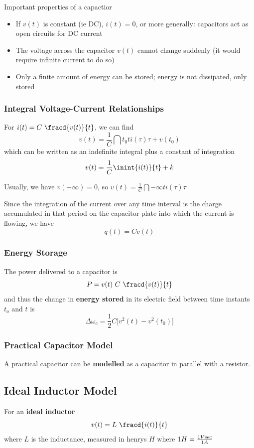 \documentclass[12pt]{article}
\begin{document}
Important properties of a capactior
\begin{itemize}
\item If $v(t)$ is constant (ie DC), $i(t) = 0$, or more generally: capacitors act as open circuits for DC current
\item The voltage across the capacitor $v(t)$ cannot change suddenly (it would require infinite current to do so)
\item Only a finite amount of energy can be stored; energy is not dissipated, only stored
\end{itemize}

\subsubsection*{Integral Voltage-Current Relationships}
For $i(t) = C\ \fracd{v(t)}{t}$, we can find \[ v(t) = \frac{1}{C} \dint{t_0}{t}{i(\tau)}{\tau} + v(t_0) \] which can be written as an indefinite integral plus a constant of integration \[ v(t) = \frac{1}{C} \inint{i(t)}{t} + k \]

Usually, we have $v(-\infty) = 0$, so $v(t) = \frac{1}{C} \dint{-\infty}{t}{i(\tau)}{\tau}$

Since the integration of the current over any time interval is the charge accumulated in that period on the capacitor plate into which the current is flowing, we have \[ q(t) = Cv(t) \]

\subsubsection*{Energy Storage}
The power delivered to a capacitor is \[ P = v(t)\ C\ \fracd{v(t)}{t} \] and thus the change in {\bf energy stored} in its electric field between time instants $t_o$ and $t$ is \[ \Delta\omega_c = \frac{1}{2}C\bigl[v^2(t) - v^2(t_0)\bigl] \]

\subsubsection*{Practical Capacitor Model}
A practical capacitor can be {\bf modelled} as a capacitor in parallel with a resistor.

\subsection*{Ideal Inductor Model}
For an {\bf ideal inductor} \[ v(t) = L\ \fracd{i(t)}{t} \] where $L$ is the inductance, measured in henrys $H$ where $1H = \frac{1V{\rm sec}}{1A}$
\end{document}
